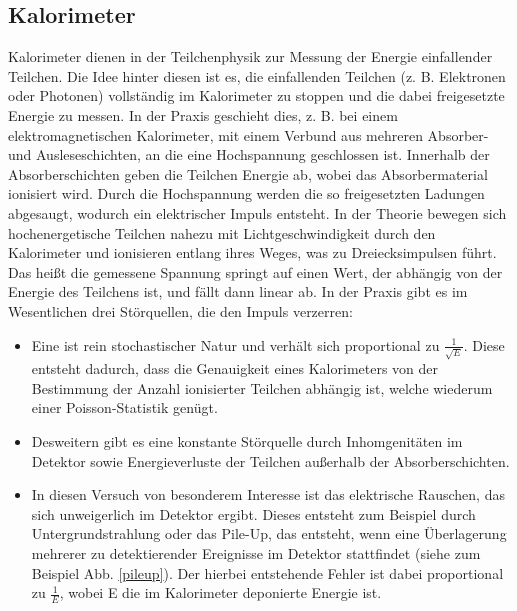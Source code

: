 \subsection{Kalorimeter}
Kalorimeter dienen in der Teilchenphysik zur Messung der Energie einfallender Teilchen.
Die Idee hinter diesen ist es, die einfallenden Teilchen (z. B. Elektronen oder Photonen) vollständig im Kalorimeter zu stoppen und die dabei freigesetzte Energie zu messen.
In der Praxis geschieht dies, z. B. bei einem elektromagnetischen Kalorimeter, mit einem Verbund aus mehreren Absorber- und Ausleseschichten, an die eine Hochspannung geschlossen ist.
Innerhalb der Absorberschichten geben die Teilchen Energie ab, wobei das Absorbermaterial ionisiert wird.
Durch die Hochspannung werden die so freigesetzten Ladungen abgesaugt, wodurch ein elektrischer Impuls entsteht.
In der Theorie bewegen sich hochenergetische Teilchen nahezu mit Lichtgeschwindigkeit durch den Kalorimeter und ionisieren entlang ihres Weges, was zu Dreiecksimpulsen führt.
Das heißt die gemessene Spannung springt auf einen Wert, der abhängig von der Energie des Teilchens ist, und fällt dann linear ab.
In der Praxis gibt es im Wesentlichen drei Störquellen, die den Impuls verzerren:
\begin{itemize}
\item Eine ist rein stochastischer Natur und verhält sich proportional zu $\frac{1}{\sqrt{E}}$.
Diese entsteht dadurch, dass die Genauigkeit eines Kalorimeters von der Bestimmung der Anzahl ionisierter Teilchen abhängig ist, welche wiederum einer Poisson-Statistik genügt.

\item Desweitern gibt es eine konstante Störquelle durch Inhomgenitäten im Detektor sowie Energieverluste der Teilchen außerhalb der Absorberschichten.

\item In diesen Versuch von besonderem Interesse ist das elektrische Rauschen, das sich unweigerlich im Detektor ergibt.
Dieses entsteht zum Beispiel durch Untergrundstrahlung oder das Pile-Up, das entsteht, wenn eine Überlagerung mehrerer zu detektierender Ereignisse im Detektor stattfindet (siehe zum Beispiel Abb. \ref{pileup}).
Der hierbei entstehende Fehler ist dabei proportional zu $\frac{1}{E}$, wobei E die im Kalorimeter deponierte Energie ist.
\end{itemize}

